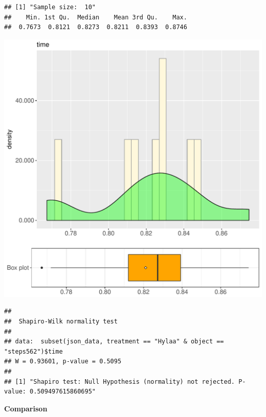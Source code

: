 \documentclass{article}\usepackage[]{graphicx}\usepackage[]{color}
\makeatletter
\def\maxwidth{ %
  \ifdim\Gin@nat@width>\linewidth
    \linewidth
  \else
    \Gin@nat@width
  \fi
}
\newenvironment{kframe}{%
 \def\at@end@of@kframe{}%
 \ifinner\ifhmode%
  \def\at@end@of@kframe{\end{minipage}}%
  \begin{minipage}{\columnwidth}%
 \fi\fi%
 \def\FrameCommand##1{\hskip\@totalleftmargin \hskip-\fboxsep
 \colorbox{shadecolor}{##1}\hskip-\fboxsep
     \hskip-\linewidth \hskip-\@totalleftmargin \hskip\columnwidth}%
 \MakeFramed {\advance\hsize-\width
   \@totalleftmargin\z@ \linewidth\hsize
   \@setminipage}}%
 {\par\unskip\endMakeFramed%
 \at@end@of@kframe}
\newenvironment{knitrout}{}{} %
\makeatother
\begin{document}
\begin{knitrout}
\color{fgcolor}\begin{kframe}
\begin{verbatim}
## [1] "Sample size:  10"
##    Min. 1st Qu.  Median    Mean 3rd Qu.    Max. 
##  0.7673  0.8121  0.8273  0.8211  0.8393  0.8746
\end{verbatim}
\end{kframe}
\includegraphics[width=\maxwidth]{figure/RH2_Hylaa_steps562-1} 
\begin{kframe}\begin{verbatim}
## 
## 	Shapiro-Wilk normality test
## 
## data:  subset(json_data, treatment == "Hylaa" & object == "steps562")$time
## W = 0.93601, p-value = 0.5095
## 
## [1] "Shapiro test: Null Hypothesis (normality) not rejected. P-value: 0.509497615860695"
\end{verbatim}
\end{kframe}
\end{knitrout}
  
 \textbf{Comparison}
  
\end{document}

